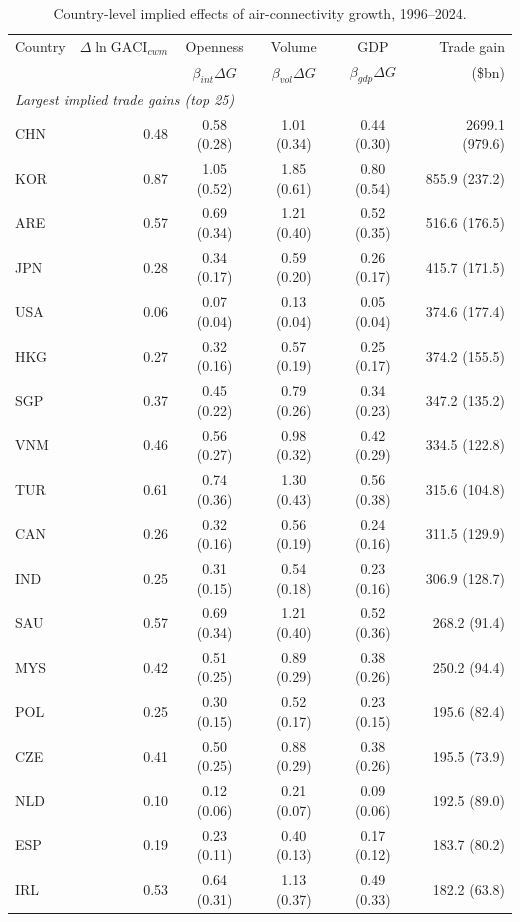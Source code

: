 \begin{table}[t]
\centering
\caption{Country-level implied effects of air-connectivity growth, 1996--2024.}
\label{tab:country}
\begin{threeparttable}
\scriptsize
\begin{tabular}{lrcccr}
\toprule
Country & $\Delta\ln\mathrm{GACI}_{cwm}$ & Openness & Volume & GDP & Trade gain \\
 & & $\beta_{int}\Delta G$ & $\beta_{vol}\Delta G$ & $\beta_{gdp}\Delta G$ & (\$bn) \\
\midrule
\multicolumn{6}{l}{\emph{Largest implied trade gains (top 25)}}\\
CHN & 0.48 & 0.58 (0.28) & 1.01 (0.34) & 0.44 (0.30) & 2699.1 (979.6) \\
KOR & 0.87 & 1.05 (0.52) & 1.85 (0.61) & 0.80 (0.54) & 855.9 (237.2) \\
ARE & 0.57 & 0.69 (0.34) & 1.21 (0.40) & 0.52 (0.35) & 516.6 (176.5) \\
JPN & 0.28 & 0.34 (0.17) & 0.59 (0.20) & 0.26 (0.17) & 415.7 (171.5) \\
USA & 0.06 & 0.07 (0.04) & 0.13 (0.04) & 0.05 (0.04) & 374.6 (177.4) \\
HKG & 0.27 & 0.32 (0.16) & 0.57 (0.19) & 0.25 (0.17) & 374.2 (155.5) \\
SGP & 0.37 & 0.45 (0.22) & 0.79 (0.26) & 0.34 (0.23) & 347.2 (135.2) \\
VNM & 0.46 & 0.56 (0.27) & 0.98 (0.32) & 0.42 (0.29) & 334.5 (122.8) \\
TUR & 0.61 & 0.74 (0.36) & 1.30 (0.43) & 0.56 (0.38) & 315.6 (104.8) \\
CAN & 0.26 & 0.32 (0.16) & 0.56 (0.19) & 0.24 (0.16) & 311.5 (129.9) \\
IND & 0.25 & 0.31 (0.15) & 0.54 (0.18) & 0.23 (0.16) & 306.9 (128.7) \\
SAU & 0.57 & 0.69 (0.34) & 1.21 (0.40) & 0.52 (0.36) & 268.2 (91.4) \\
MYS & 0.42 & 0.51 (0.25) & 0.89 (0.29) & 0.38 (0.26) & 250.2 (94.4) \\
POL & 0.25 & 0.30 (0.15) & 0.52 (0.17) & 0.23 (0.15) & 195.6 (82.4) \\
CZE & 0.41 & 0.50 (0.25) & 0.88 (0.29) & 0.38 (0.26) & 195.5 (73.9) \\
NLD & 0.10 & 0.12 (0.06) & 0.21 (0.07) & 0.09 (0.06) & 192.5 (89.0) \\
ESP & 0.19 & 0.23 (0.11) & 0.40 (0.13) & 0.17 (0.12) & 183.7 (80.2) \\
IRL & 0.53 & 0.64 (0.31) & 1.13 (0.37) & 0.49 (0.33) & 182.2 (63.8) \\

\end{tabular}
\end{threeparttable}
\end{table}
